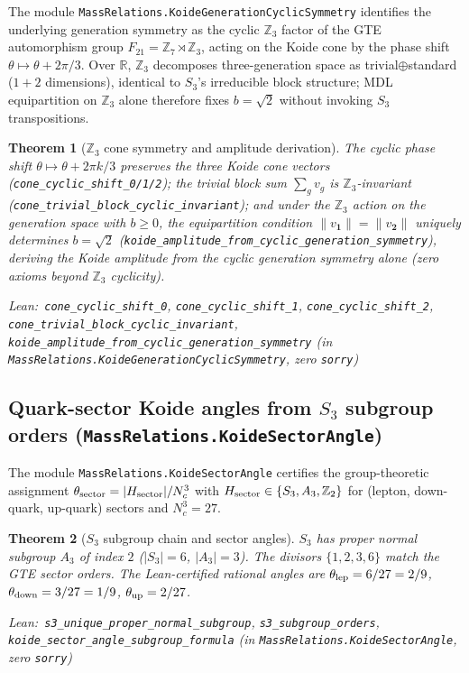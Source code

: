 \documentclass[11pt,a4paper]{article}
\newenvironment{leanref}%
  {\par\smallskip\noindent\begingroup\raggedright\textup{Lean:}~}%
  {\par\endgroup}
\newtheorem{theorem}{Theorem}[section]
\theoremstyle{definition}
\begin{document}
The module \texttt{MassRelations.KoideGenerationCyclicSymmetry} identifies the underlying
generation symmetry as the cyclic $\mathbb{Z}_3$ factor of the GTE automorphism group
$F_{21} = \mathbb{Z}_7 \rtimes \mathbb{Z}_3$, acting on the Koide cone by the phase shift
$\theta \mapsto \theta + 2\pi/3$.  Over $\mathbb{R}$, $\mathbb{Z}_3$ decomposes
three-generation space as trivial$\oplus$standard ($1+2$ dimensions), identical to
$S_3$'s irreducible block structure; MDL equipartition on $\mathbb{Z}_3$ alone therefore
fixes $b = \sqrt{2}$ without invoking $S_3$ transpositions.

\begin{theorem}[$\mathbb{Z}_3$ cone symmetry and amplitude derivation]\label{thm:koide-cyclic-z3}
The cyclic phase shift $\theta \mapsto \theta + 2\pi k/3$ preserves the three Koide
cone vectors (\lstinline|cone_cyclic_shift_0/1/2|); the trivial block sum $\sum_g v_g$
is $\mathbb{Z}_3$-invariant (\lstinline|cone_trivial_block_cyclic_invariant|); and
under the $\mathbb{Z}_3$ action on the generation space with $b \ge 0$, the
equipartition condition $\|v_{\mathbf{1}}\| = \|v_{\mathbf{2}}\|$ uniquely determines
$b = \sqrt{2}$ (\lstinline|koide_amplitude_from_cyclic_generation_symmetry|), deriving
the Koide amplitude from the cyclic generation symmetry alone (zero axioms beyond
$\mathbb{Z}_3$ cyclicity).

\begin{leanref}\lstinline|cone_cyclic_shift_0|,
\lstinline|cone_cyclic_shift_1|,
\lstinline|cone_cyclic_shift_2|,
\lstinline|cone_trivial_block_cyclic_invariant|,
\lstinline|koide_amplitude_from_cyclic_generation_symmetry|
\textup{(in \texttt{MassRelations.KoideGenerationCyclicSymmetry}, zero \texttt{sorry})}\end{leanref}
\end{theorem}

\subsection{Quark-sector Koide angles from $S_3$ subgroup orders (\texttt{MassRelations.KoideSectorAngle})}\label{subsec:koide-sector-angle}

The module \texttt{MassRelations.KoideSectorAngle} certifies the group-theoretic
assignment $\theta_{\rm sector} = |H_{\rm sector}|/N_c^3$ with
$H_{\rm sector} \in \{S_3, A_3, \mathbb{Z}_2\}$ for (lepton, down-quark, up-quark)
sectors and $N_c^3 = 27$.

\begin{theorem}[$S_3$ subgroup chain and sector angles]\label{thm:koide-sector-angle}
$S_3$ has proper normal subgroup $A_3$ of index $2$ ($|S_3|=6$, $|A_3|=3$).
The divisors $\{1,2,3,6\}$ match the GTE sector orders.  The Lean-certified
rational angles are $\theta_{\rm lep}=6/27=2/9$, $\theta_{\rm down}=3/27=1/9$,
$\theta_{\rm up}=2/27$.

\begin{leanref}\lstinline|s3_unique_proper_normal_subgroup|,
\lstinline|s3_subgroup_orders|,
\lstinline|koide_sector_angle_subgroup_formula|
\textup{(in \texttt{MassRelations.KoideSectorAngle}, zero \texttt{sorry})}\end{leanref}
\end{theorem}
\end{document}
